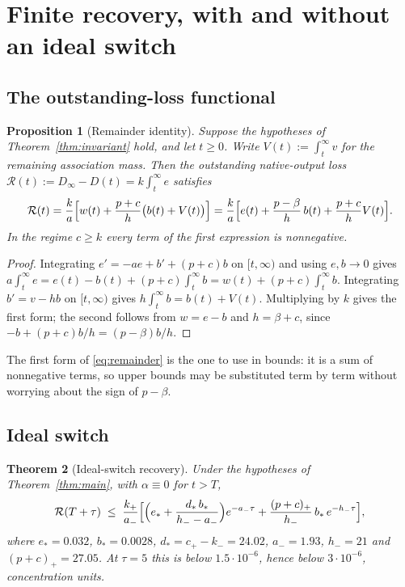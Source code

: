 \documentclass[11pt]{article}
\newtheorem{theorem}{Theorem}[section]
\newtheorem{proposition}[theorem]{Proposition}
\theoremstyle{definition}
\theoremstyle{remark}
\newcommand{\Rem}{\mathcal{R}}
\begin{document}
\section{Finite recovery, with and without an ideal switch}
\label{sec:recovery}

\subsection{The outstanding-loss functional}

\begin{proposition}[Remainder identity]\label{prop:remainder}
Suppose the hypotheses of Theorem~\ref{thm:invariant} hold, and let $t\ge0$.
Write $V(t):=\int_t^\infty v$ for the remaining association mass. Then the
outstanding native-output loss $\Rem(t):=D_\infty-D(t)=k\int_t^\infty e$
satisfies
\begin{equation}
\Rem(t)=\frac ka\Bigl[w(t)+\frac{p+c}{h}\bigl(b(t)+V(t)\bigr)\Bigr]
=\frac ka\Bigl[e(t)+\frac{p-\beta}{h}\,b(t)+\frac{p+c}{h}V(t)\Bigr].
\label{eq:remainder}
\end{equation}
In the regime $c\ge k$ every term of the first expression is nonnegative.
\end{proposition}

\begin{proof}
Integrating $e'=-ae+b'+(p+c)b$ on $[t,\infty)$ and using $e,b\to0$ gives
$a\int_t^\infty e=e(t)-b(t)+(p+c)\int_t^\infty b=w(t)+(p+c)\int_t^\infty b$.
Integrating $b'=v-hb$ on $[t,\infty)$ gives
$h\int_t^\infty b=b(t)+V(t)$. Multiplying by $k$ gives the first form; the
second follows from $w=e-b$ and $h=\beta+c$, since
$-b+(p+c)b/h=(p-\beta)b/h$.
\end{proof}

The first form of \eqref{eq:remainder} is the one to use in bounds: it is a sum
of nonnegative terms, so upper bounds may be substituted term by term without
worrying about the sign of $p-\beta$.

\subsection{Ideal switch}

\begin{theorem}[Ideal-switch recovery]\label{thm:ideal}
Under the hypotheses of Theorem~\ref{thm:main}, with $\alpha\equiv0$ for $t>T$,
\[
\Rem(T+\tau)\;\le\;\frac{k_+}{a_-}\Bigl[
\Bigl(e_*+\frac{d_*\,b_*}{h_--a_-}\Bigr)e^{-a_-\tau}
+\frac{(p+c)_+}{h_-}\,b_*\,e^{-h_-\tau}\Bigr],
\]
where $e_*=0.032$, $b_*=0.0028$, $d_*=c_+-k_-=24.02$, $a_-=1.93$, $h_-=21$ and
$(p+c)_+=27.05$. At $\tau=5$ this is below $1.5\cdot10^{-6}$, hence below
$3\cdot10^{-6}$, concentration units.
\end{theorem}
\end{document}
